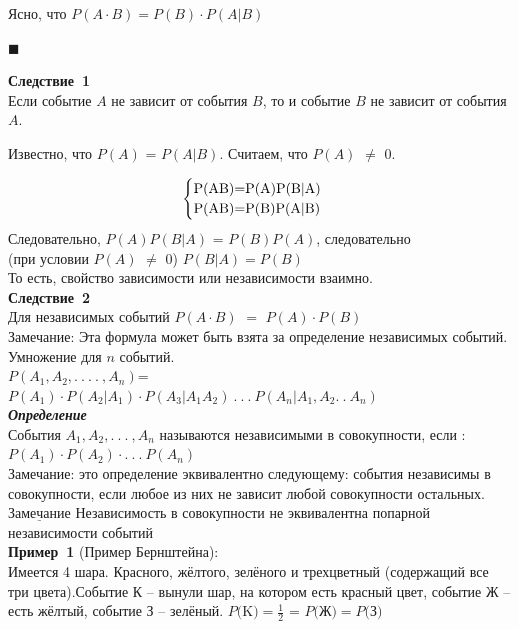 \documentclass[russian, 12pt, fleqn]{article}
\begin{document}
Ясно, что $P(A\cdot B) = P(B)\cdot P(A|B)$
\begin{flushright}\(\blacksquare\)\end{flushright}
\textbf{Следствие\ 1}\\Если событие $A$ не зависит от события $B$, то и событие $B$ не зависит от события $A$.
\begin{tabbing}
Известно, что $P(A)$ = $P(A|B)$. Считаем, что $P(A)$ $\neq$ $0$.\\
\end{tabbing}
\begin{equation*} 
 \begin{cases}
   $P(AB)$ = $P(A)P(B|A)$\\
   $P(AB)$ = $P(B)P(A|B)$
 \end{cases}
\end{equation*}
Следовательно, $P(A)P(B|A)$ = $P(B)P(A)$, следовательно\\
(при условии $P(A)$ $\neq$ $0$) $P(B|A)=P(B)$\\
То есть, свойство зависимости или независимости взаимно.\\
\textbf{Следствие\ 2}\\ Для независимых событий $P(A\cdot B)$ $=$ $P(A)\cdot P(B)$\\
Замечание: Эта формула может быть взята за определение независимых событий.\\
Умножение для $n$ событий.\\ $P(A_1, A_2, .\ .\ .\ .\ , A_n)$=$P(A_1)\cdot P(A_2|A_1) \cdot P(A_3|A_1A_2) \ .\ .\ . \ P(A_n|A_1,A_2 .\ .\ A_n)$\\
\textit{\textbf{Определение}}\\События $A_1, A_2, .\ .\ .\ , A_n$ называются независимыми в совокупности, если :\\ $P(A_1)\cdot P(A_2) \cdot .\ .\ .\  P(A_n)$\\
Замечание: это определение эквивалентно следующему: события независимы в совокупности, если любое из них не зависит любой совокупности остальных.\\
$\underline{Замечание}$ Независимость в совокупности не эквивалентна попарной независимости событий\\
\textbf{Пример\ 1 }(Пример Бернштейна): \\Имеется 4 шара. Красного, жёлтого, зелёного и трехцветный (содержащий все три цвета).Событие К --  вынули шар, на котором есть красный цвет, событие Ж -- есть жёлтый, событие З -- зелёный. $P($K$)=\frac{1}{2}$ = $P($Ж$)=P($З$)$\\
\end{document}
